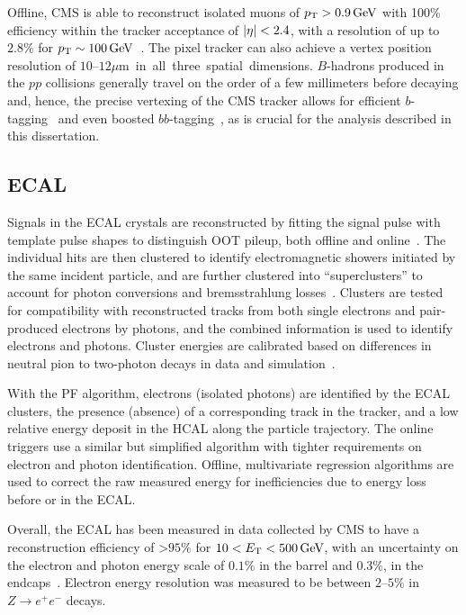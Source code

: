 Offline, CMS is able to reconstruct isolated muons of $p_\mathrm{T} > 0.9\,\text{Ge\hspace{-.08em}V}$ with 100\% efficiency within the tracker acceptance of $\left\lvert \eta \right\rvert < 2.4$, with a \pt resolution of up to $2.8\%$ for $p_\mathrm{T} \sim 100\,\text{Ge\hspace{-.08em}V}$~\cite{CMS:2014pgm}.
The pixel tracker can also achieve a vertex position resolution of $10$--$12$\unit{$\mu$m} in all three spatial dimensions.
$B$-hadrons produced in the $pp$ collisions generally travel on the order of a few millimeters before decaying and, hence, the precise vertexing of the CMS tracker allows for efficient $b$-tagging~\cite{CMS:2016kkf} and even boosted $bb$-tagging~\cite{CMS:2023tlv}, as is crucial for the analysis described in this dissertation.

\subsection{ECAL}

Signals in the ECAL crystals are reconstructed by fitting the signal pulse with template pulse shapes to distinguish OOT pileup, both offline and online~\cite{CMS:2020xlg}.
The individual hits are then clustered to identify electromagnetic showers initiated by the same incident particle, and are further clustered into ``superclusters'' to account for photon conversions and bremsstrahlung losses~\cite{CMS:2020uim}.
Clusters are tested for compatibility with reconstructed tracks from both single electrons and pair-produced electrons by photons, and the combined information is used to identify electrons and photons.
Cluster energies are calibrated based on differences in neutral pion to two-photon decays in data and simulation~\cite{CMS:2017yfk}.

With the PF algorithm, electrons (isolated photons) are identified by the ECAL clusters, the presence (absence) of a corresponding track in the tracker, and a low relative energy deposit in the HCAL along the particle trajectory.
The online triggers use a similar but simplified algorithm with tighter requirements on electron and photon identification.
Offline, multivariate regression algorithms are used to correct the raw measured energy for inefficiencies due to energy loss before or in the ECAL.

Overall, the ECAL has been measured in data collected by CMS to have a reconstruction efficiency of >$95\%$ for $10 < E_\mathrm{T} < 500\,\text{Ge\hspace{-.08em}V}$, with an uncertainty on the electron and photon energy scale of $0.1\%$ in the barrel and $0.3\%$, in the endcaps~\cite{CMS:2020uim}.
Electron energy resolution was measured to be between $2$--$5\%$ in $Z\to e^+e^-$ decays.

